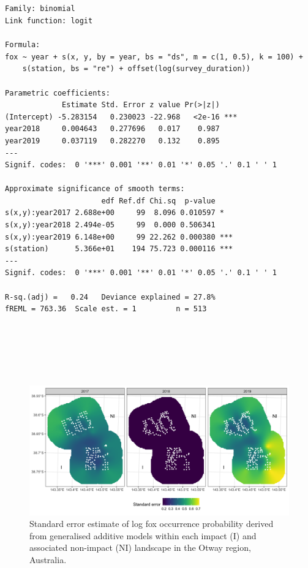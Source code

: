 \documentclass[11pt,a4paper,titlepage,twoside,openright]{style/unimelbthesis}
\begin{document}
\begin{mainmatter}
\(~\)

\(~\)

\(~\)
\begin{verbatim}

Family: binomial 
Link function: logit 

Formula:
fox ~ year + s(x, y, by = year, bs = "ds", m = c(1, 0.5), k = 100) + 
    s(station, bs = "re") + offset(log(survey_duration))

Parametric coefficients:
             Estimate Std. Error z value Pr(>|z|)    
(Intercept) -5.283154   0.230023 -22.968   <2e-16 ***
year2018     0.004643   0.277696   0.017    0.987    
year2019     0.037119   0.282270   0.132    0.895    
---
Signif. codes:  0 '***' 0.001 '**' 0.01 '*' 0.05 '.' 0.1 ' ' 1

Approximate significance of smooth terms:
                      edf Ref.df Chi.sq  p-value    
s(x,y):year2017 2.688e+00     99  8.096 0.010597 *  
s(x,y):year2018 2.494e-05     99  0.000 0.506341    
s(x,y):year2019 6.148e+00     99 22.262 0.000380 ***
s(station)      5.366e+01    194 75.723 0.000116 ***
---
Signif. codes:  0 '***' 0.001 '**' 0.01 '*' 0.05 '.' 0.1 ' ' 1

R-sq.(adj) =   0.24   Deviance explained = 27.8%
fREML = 763.36  Scale est. = 1         n = 513
\end{verbatim}
\newpage

\(~\)

\(~\)

\(~\)
\begin{figure}

{\centering \includegraphics[width=1\linewidth]{figure/fox_occ_se_otways_600dpi} 

}

\caption{Standard error estimate of log fox occurrence probability derived from generalised additive models within each impact (I) and associated non-impact (NI) landscape in the Otway region, Australia.}\label{fig:density-fox-se-o}
\end{figure}
\newpage


\end{mainmatter}
\end{document}
